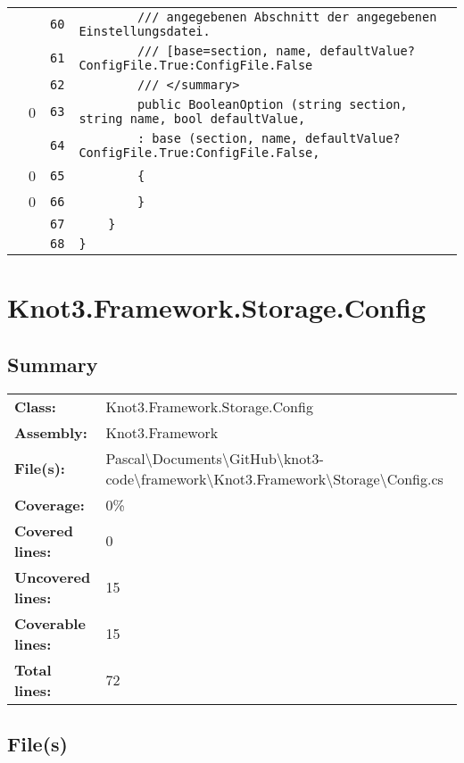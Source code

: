 \documentclass[a4paper,10pt]{article}
\begin{document}
\begin{longtable}[l]{lrrl}
\cellcolor{gray} &  & \verb~60~ & \verb~        /// angegebenen Abschnitt der angegebenen Einstellungsdatei.~\\
\cellcolor{gray} &  & \verb~61~ & \verb~        /// [base=section, name, defaultValue?ConfigFile.True:ConfigFile.False~\\
\cellcolor{gray} &  & \verb~62~ & \verb~        /// </summary>~\\
\cellcolor{red} & 0 & \verb~63~ & \verb~        public BooleanOption (string section, string name, bool defaultValue, ~\\
\cellcolor{gray} &  & \verb~64~ & \verb~        : base (section, name, defaultValue?ConfigFile.True:ConfigFile.False, ~\\
\cellcolor{red} & 0 & \verb~65~ & \verb~        {~\\
\cellcolor{red} & 0 & \verb~66~ & \verb~        }~\\
\cellcolor{gray} &  & \verb~67~ & \verb~    }~\\
\cellcolor{gray} &  & \verb~68~ & \verb~}~\\
\end{longtable}
\newpage
\section{Knot3.Framework.Storage.Config}
\subsection{Summary}
\begin{longtable}[l]{ll}
\textbf{Class:} & Knot3.Framework.Storage.Config\\
\textbf{Assembly:} & Knot3.Framework\\
\textbf{File(s):} & \begin{minipage}[t]{12cm}{Pascal\textbackslash Documents\textbackslash GitHub\textbackslash knot3-code\textbackslash framework\textbackslash Knot3.Framework\textbackslash Storage\textbackslash Config.cs}\end{minipage} \\
\textbf{Coverage:} & 0\%\\
\textbf{Covered lines:} & 0\\
\textbf{Uncovered lines:} & 15\\
\textbf{Coverable lines:} & 15\\
\textbf{Total lines:} & 72\\
\end{longtable}
\subsection{File(s)}
\end{document}
